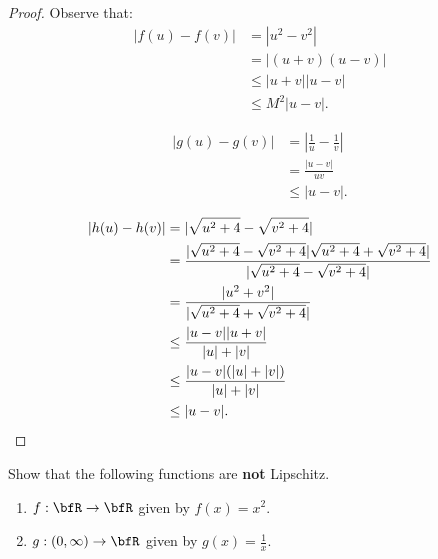 \documentclass[11pt,twoside,openany]{memoir}
\begin{document}
        \begin{proof}
            Observe that:
                \begin{equation*}
                \begin{split}
                    |f(u) - f(v)|
                    & = |u^2 - v^2| \\
                    & = |(u+v)(u-v)| \\
                    & \leq |u+v||u-v| \\
                    & \leq M^2|u-v|.
                \end{split}
                \end{equation*}

                \begin{equation*}
                \begin{split}
                    |g(u) - g(v)|
                    & = \left|\frac{1}{u} - \frac{1}{v}\right| \\
                    & = \frac{\left|u-v\right|}{uv} \\
                    & \leq |u-v|. 
                \end{split}
                \end{equation*}

                \begin{equation*}
                \begin{split}
                    |h(u) - h(v)|
                    & = |\sqrt{u^2 + 4} - \sqrt{v^2 + 4}| \\
                    & = \frac{|\sqrt{u^2 + 4} - \sqrt{v^2 + 4}|\sqrt{u^2 + 4} + \sqrt{v^2 + 4}|}{|\sqrt{u^2 + 4} - \sqrt{v^2 + 4}|} \\
                    & = \frac{|u^2 + v^2|}{|\sqrt{u^2 + 4} + \sqrt{v^2 + 4}|} \\
                    & \leq \frac{|u-v||u+v|}{|u| + |v|} \\
                    & \leq \frac{|u-v|(|u| + |v|)}{|u| + |v|} \\
                    & \leq |u-v|. \qedhere
                \end{split}
                \end{equation*}
        \end{proof}
    \begin{exercise}
        Show that the following functions are \textbf{not} Lipschitz.
            \begin{enumerate}[label = (\arabic*)]
                \item $f:\bfR \rightarrow \bfR$ given by $f(x) = x^2$.
                \item $g:(0,\infty) \rightarrow \bfR$ given by $g(x) = \frac{1}{x}$.
            \end{enumerate}
    \end{exercise}
\end{document}

